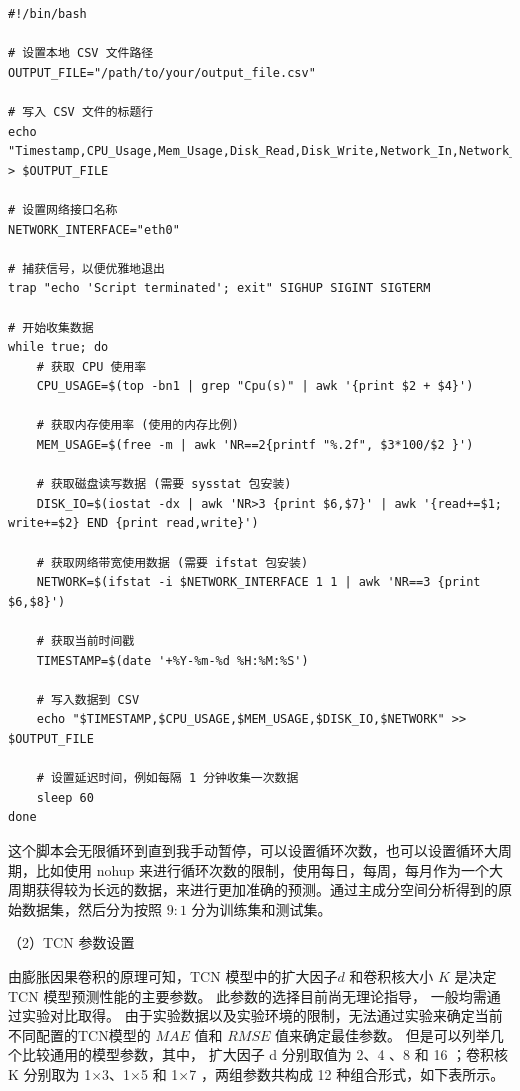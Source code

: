 \begin{lstlisting}
#!/bin/bash

# 设置本地 CSV 文件路径
OUTPUT_FILE="/path/to/your/output_file.csv"

# 写入 CSV 文件的标题行
echo "Timestamp,CPU_Usage,Mem_Usage,Disk_Read,Disk_Write,Network_In,Network_Out" > $OUTPUT_FILE

# 设置网络接口名称
NETWORK_INTERFACE="eth0"

# 捕获信号，以便优雅地退出
trap "echo 'Script terminated'; exit" SIGHUP SIGINT SIGTERM

# 开始收集数据
while true; do
    # 获取 CPU 使用率
    CPU_USAGE=$(top -bn1 | grep "Cpu(s)" | awk '{print $2 + $4}')

    # 获取内存使用率 (使用的内存比例)
    MEM_USAGE=$(free -m | awk 'NR==2{printf "%.2f", $3*100/$2 }')

    # 获取磁盘读写数据 (需要 sysstat 包安装)
    DISK_IO=$(iostat -dx | awk 'NR>3 {print $6,$7}' | awk '{read+=$1; write+=$2} END {print read,write}')

    # 获取网络带宽使用数据 (需要 ifstat 包安装)
    NETWORK=$(ifstat -i $NETWORK_INTERFACE 1 1 | awk 'NR==3 {print $6,$8}')

    # 获取当前时间戳
    TIMESTAMP=$(date '+%Y-%m-%d %H:%M:%S')

    # 写入数据到 CSV
    echo "$TIMESTAMP,$CPU_USAGE,$MEM_USAGE,$DISK_IO,$NETWORK" >> $OUTPUT_FILE

    # 设置延迟时间，例如每隔 1 分钟收集一次数据
    sleep 60
done
\end{lstlisting}

这个脚本会无限循环到直到我手动暂停，可以设置循环次数，也可以设置循环大周期，比如使用 nohup 来进行循环次数的限制，使用每日，每周，每月作为一个大周期获得较为长远的数据，来进行更加准确的预测。通过主成分空间分析得到的原始数据集，然后分为按照 $9:1$ 分为训练集和测试集。

（2）TCN 参数设置

由膨胀因果卷积的原理可知，TCN 模型中的扩大因子$d$ 和卷积核大小 $K$ 是决定TCN 模型预测性能的主要参数。
此参数的选择目前尚无理论指导， 一般均需通过实验对比取得\cite{hewage2020temporal}。
由于实验数据以及实验环境的限制，无法通过实验来确定当前不同配置的TCN模型的 $MAE$ 值和 $RMSE$ 值来确定最佳参数。
但是可以列举几个比较通用的模型参数，其中， 扩大因子 d 分别取值为 2、4 、8 和 16 ；卷积核 K 分别取为 1×3、1×5 和 1×7 ，两组参数共构成 12 种组合形式，如下表所示。

